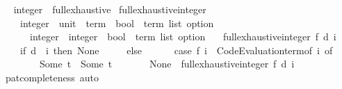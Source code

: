\begin{isabellebody}
\isanewline
{}\isamarkupfalse%
%
\isadelimproof
\ %
\endisadelimproof
%
\isatagproof
\isacommand{{\isachardot}{\kern0pt}{\isachardot}{\kern0pt}}\isamarkupfalse%
%
\endisatagproof
{\isafoldproof}%
%
\isadelimproof
%
\endisadelimproof
\isanewline
\isanewline
{}\isamarkupfalse%
\isanewline
\isanewline
{}\isamarkupfalse%
\ integer\ {\isacharcolon}{\kern0pt}{\isacharcolon}{\kern0pt}\ full{\isacharunderscore}{\kern0pt}exhaustive\isanewline
{}\isanewline
\isanewline
{}\isamarkupfalse%
\ full{\isacharunderscore}{\kern0pt}exhaustive{\isacharunderscore}{\kern0pt}integer{\isacharprime}{\kern0pt}\ {\isacharcolon}{\kern0pt}{\isacharcolon}{\kern0pt}\isanewline
\ \ \ \ {\isachardoublequoteopen}{\isacharparenleft}{\kern0pt}integer\ {\isasymtimes}\ {\isacharparenleft}{\kern0pt}unit\ {\isasymRightarrow}\ term{\isacharparenright}{\kern0pt}\ {\isasymRightarrow}\ {\isacharparenleft}{\kern0pt}bool\ {\isasymtimes}\ term\ list{\isacharparenright}{\kern0pt}\ option{\isacharparenright}{\kern0pt}\ {\isasymRightarrow}\isanewline
\ \ \ \ \ \ integer\ {\isasymRightarrow}\ integer\ {\isasymRightarrow}\ {\isacharparenleft}{\kern0pt}bool\ {\isasymtimes}\ term\ list{\isacharparenright}{\kern0pt}\ option{\isachardoublequoteclose}\isanewline
\ \ \ {\isachardoublequoteopen}full{\isacharunderscore}{\kern0pt}exhaustive{\isacharunderscore}{\kern0pt}integer{\isacharprime}{\kern0pt}\ f\ d\ i\ {\isacharequal}{\kern0pt}\isanewline
\ \ \ \ {\isacharparenleft}{\kern0pt}if\ d\ {\isacharless}{\kern0pt}\ i\ then\ None\isanewline
\ \ \ \ \ else\isanewline
\ \ \ \ \ \ {\isacharparenleft}{\kern0pt}case\ f\ {\isacharparenleft}{\kern0pt}i{\isacharcomma}{\kern0pt}\ {\isasymlambda}{\isacharunderscore}{\kern0pt}{\isachardot}{\kern0pt}\ Code{\isacharunderscore}{\kern0pt}Evaluation{\isachardot}{\kern0pt}term{\isacharunderscore}{\kern0pt}of\ i{\isacharparenright}{\kern0pt}\ of\isanewline
\ \ \ \ \ \ \ \ Some\ t\ {\isasymRightarrow}\ Some\ t\isanewline
\ \ \ \ \ \ {\isacharbar}{\kern0pt}\ None\ {\isasymRightarrow}\ full{\isacharunderscore}{\kern0pt}exhaustive{\isacharunderscore}{\kern0pt}integer{\isacharprime}{\kern0pt}\ f\ d\ {\isacharparenleft}{\kern0pt}i\ {\isacharplus}{\kern0pt}\ {}{\isacharparenright}{\kern0pt}{\isacharparenright}{\kern0pt}{\isacharparenright}{\kern0pt}{\isachardoublequoteclose}\isanewline
%
\isadelimproof
%
\endisadelimproof
%
\isatagproof
{}\isamarkupfalse%
\ pat{\isacharunderscore}{\kern0pt}completeness\ auto%
\endisatagproof
{\isafoldproof}%
%
\isadelimproof

\end{isabellebody}
